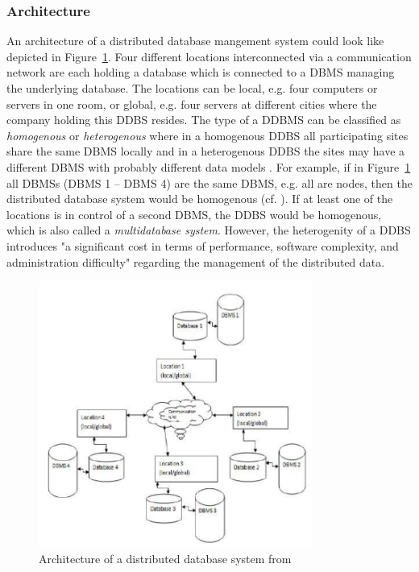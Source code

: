 \subsubsection{Architecture}
\label{sec:theo_ddb_arch}
An architecture of a distributed database mangement system could look like depicted in Figure~\ref{fig:ddbs_arch}. Four different locations interconnected via
a communication network are each holding a database which is connected to a DBMS managing the underlying database. The locations can be local, e.g. four 
computers or servers in one room, or global, e.g. four servers at different cities where the company holding this DDBS resides. The type of a DDBMS can be
classified as \emph{homogenous} or \emph{heterogenous} where in a homogenous DDBS all participating sites share the same DBMS locally and in a heterogenous
DDBS the sites may have a different DBMS with probably different data models \cite[p.~607]{Ramakrish2000}. For example, if in Figure~\ref{fig:ddbs_arch} all
DBMSs (DBMS 1 -- DBMS 4) are the same DBMS, e.g. all are  nodes, then the distributed database system would be homogenous (cf. 
\cite[Fig.~2]{Jadhav2017}). If at least one of the locations is in control of a second DBMS, the DDBS would be homogenous, which is also called a 
\emph{multidatabase system}. However, the heterogenity of a DDBS introduces "a significant cost in terms of performance, software complexity, and
administration difficulty" \cite[p.~608, l.13--14]{Ramakrish2000} regarding the management of the distributed data.

\begin{figure}[h]
    \centering
    \includegraphics[width=0.8\textwidth,keepaspectratio=true]{img/DDBMS_Architecture.pdf}
    \caption{Architecture of a distributed database system from \cite[Fig.~1]{Kumar2013}}
    \label{fig:ddbs_arch}
\end{figure}

